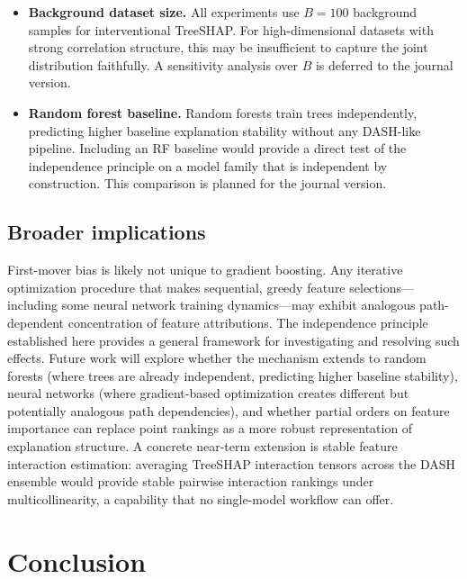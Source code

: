 \documentclass[11pt]{article}
\newcommand{\dash}{\textsc{DASH}}
\begin{document}
\begin{itemize}
    Wilcoxon test is underpowered for the small effect sizes between
    \dash{} and Stochastic Retrain. Larger $N_{\text{reps}}$ would
    strengthen the analysis.
  \item \textbf{Background dataset size.} All experiments use $B = 100$
    background samples for interventional TreeSHAP. For high-dimensional
    datasets with strong correlation structure, this may be insufficient
    to capture the joint distribution faithfully. A sensitivity analysis
    over $B$ is deferred to the journal version.
  \item \textbf{Random forest baseline.} Random forests train trees
    independently, predicting higher baseline explanation stability
    without any DASH-like pipeline. Including an RF baseline would
    provide a direct test of the independence principle on a model family
    that is independent by construction. This comparison is planned for
    the journal version.
\end{itemize}

\subsection{Broader implications}

First-mover bias is likely not unique to gradient boosting. Any
iterative optimization procedure that makes sequential, greedy feature
selections---including some neural network training dynamics---may exhibit
analogous path-dependent concentration of feature attributions. The
independence principle established here provides a general framework for
investigating and resolving such effects. Future work will explore
whether the mechanism extends to random forests (where trees are
already independent, predicting higher baseline stability), neural
networks (where gradient-based optimization creates different but
potentially analogous path dependencies), and whether partial orders
on feature importance can replace point rankings as a more robust
representation of explanation structure. A concrete near-term extension
is stable feature interaction estimation: averaging TreeSHAP interaction
tensors across the \dash{} ensemble would provide stable pairwise
interaction rankings under multicollinearity, a capability that no
single-model workflow can offer.


\section{Conclusion}
\label{sec:conclusion}
\end{document}
